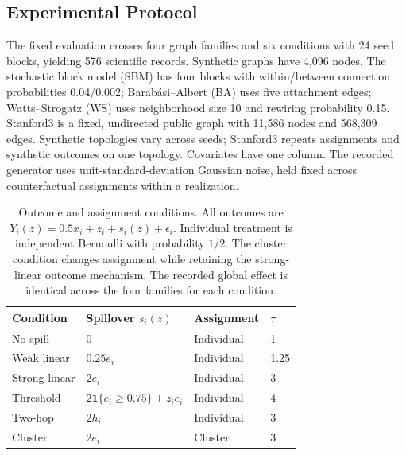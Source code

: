 \documentclass{article}
\newcommand{\gate}{\tau}
\begin{document}
\subsection{Experimental Protocol}
The fixed evaluation crosses four graph families and six conditions with 24 seed blocks, yielding 576 scientific records. Synthetic graphs have 4,096 nodes. The stochastic block model (SBM) has four blocks with within/between connection probabilities 0.04/0.002; Barab\'asi--Albert (BA) uses five attachment edges; Watts--Strogatz (WS) uses neighborhood size 10 and rewiring probability 0.15. Stanford3 is a fixed, undirected public graph with 11,586 nodes and 568,309 edges. Synthetic topologies vary across seeds; Stanford3 repeats assignments and synthetic outcomes on one topology. Covariates have one column. The recorded generator uses unit-standard-deviation Gaussian noise, held fixed across counterfactual assignments within a realization.

\begin{table}[t]
\centering
\caption{Outcome and assignment conditions. All outcomes are $Y_i(z)=0.5x_i+z_i+s_i(z)+\epsilon_i$. Individual treatment is independent Bernoulli with probability $1/2$. The cluster condition changes assignment while retaining the strong-linear outcome mechanism. The recorded global effect is identical across the four families for each condition.}
\label{tab:protocol}
\begin{tabular}{llll}
\toprule
Condition & Spillover $s_i(z)$ & Assignment & $\gate$\\
\midrule
No spill & $0$ & Individual & 1\\
Weak linear & $0.25e_i$ & Individual & 1.25\\
Strong linear & $2e_i$ & Individual & 3\\
Threshold & $2\mathbf{1}\{e_i\geq0.75\}+z_i e_i$ & Individual & 4\\
Two-hop & $2h_i$ & Individual & 3\\
Cluster & $2e_i$ & Cluster & 3\\
\bottomrule
\end{tabular}
\end{table}
\end{document}
